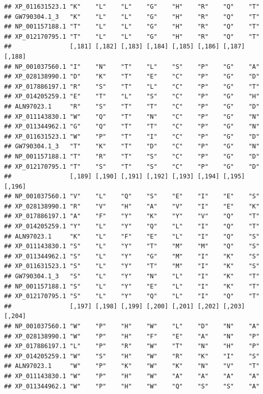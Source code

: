 \documentclass[]{article}
\begin{document}
\begin{verbatim}
## XP_011631523.1 "K"    "L"    "L"    "G"    "H"    "R"    "Q"    "T"   
## GW790304.1_3   "K"    "L"    "L"    "G"    "H"    "R"    "Q"    "T"   
## NP_001157188.1 "T"    "L"    "L"    "G"    "H"    "R"    "Q"    "T"   
## XP_012170795.1 "T"    "L"    "L"    "G"    "H"    "R"    "Q"    "T"   
##                [,181] [,182] [,183] [,184] [,185] [,186] [,187] [,188]
## NP_001037560.1 "I"    "N"    "T"    "L"    "S"    "P"    "G"    "A"   
## XP_028138990.1 "D"    "K"    "T"    "E"    "C"    "P"    "G"    "D"   
## XP_017886197.1 "R"    "S"    "T"    "L"    "C"    "P"    "G"    "T"   
## XP_014205259.1 "E"    "T"    "L"    "S"    "C"    "P"    "G"    "H"   
## ALN97023.1     "R"    "S"    "T"    "T"    "C"    "P"    "G"    "D"   
## XP_011143830.1 "W"    "Q"    "T"    "N"    "C"    "P"    "G"    "N"   
## XP_011344962.1 "G"    "Q"    "T"    "T"    "C"    "P"    "G"    "N"   
## XP_011631523.1 "W"    "P"    "T"    "I"    "C"    "P"    "G"    "D"   
## GW790304.1_3   "T"    "K"    "T"    "D"    "C"    "P"    "G"    "N"   
## NP_001157188.1 "T"    "R"    "T"    "S"    "C"    "P"    "G"    "D"   
## XP_012170795.1 "T"    "S"    "T"    "S"    "C"    "P"    "G"    "D"   
##                [,189] [,190] [,191] [,192] [,193] [,194] [,195] [,196]
## NP_001037560.1 "V"    "L"    "Q"    "S"    "E"    "I"    "E"    "S"   
## XP_028138990.1 "R"    "V"    "H"    "A"    "V"    "I"    "E"    "K"   
## XP_017886197.1 "A"    "F"    "Y"    "K"    "Y"    "V"    "Q"    "T"   
## XP_014205259.1 "Y"    "L"    "Y"    "Q"    "L"    "I"    "Q"    "T"   
## ALN97023.1     "K"    "L"    "F"    "E"    "L"    "I"    "Q"    "S"   
## XP_011143830.1 "S"    "L"    "Y"    "T"    "M"    "M"    "Q"    "S"   
## XP_011344962.1 "S"    "L"    "Y"    "G"    "M"    "I"    "K"    "S"   
## XP_011631523.1 "S"    "L"    "Y"    "T"    "M"    "I"    "K"    "S"   
## GW790304.1_3   "S"    "L"    "Y"    "N"    "L"    "I"    "K"    "T"   
## NP_001157188.1 "S"    "L"    "Y"    "E"    "L"    "I"    "K"    "T"   
## XP_012170795.1 "S"    "L"    "Y"    "Q"    "L"    "I"    "Q"    "T"   
##                [,197] [,198] [,199] [,200] [,201] [,202] [,203] [,204]
## NP_001037560.1 "W"    "P"    "H"    "W"    "L"    "D"    "N"    "A"   
## XP_028138990.1 "W"    "P"    "H"    "F"    "E"    "A"    "N"    "P"   
## XP_017886197.1 "L"    "P"    "R"    "W"    "T"    "N"    "H"    "P"   
## XP_014205259.1 "W"    "S"    "H"    "W"    "R"    "K"    "I"    "S"   
## ALN97023.1     "W"    "P"    "K"    "W"    "K"    "N"    "V"    "T"   
## XP_011143830.1 "W"    "P"    "H"    "W"    "A"    "A"    "A"    "A"   
## XP_011344962.1 "W"    "P"    "H"    "W"    "Q"    "S"    "S"    "A"   

\end{verbatim}
\end{document}
